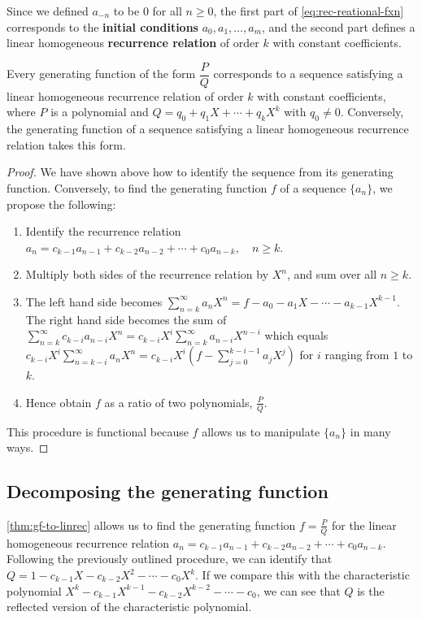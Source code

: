 \documentclass[a4paper, 12pt]{report}
\begin{document}
Since we defined $a_{-n}$ to be $0$ for all $n \geq 0$, the first part of \cref{eq:rec-reational-fxn} corresponds to the \textbf{initial conditions} $a_0, a_1, \dots, a_m$, and the second part defines a linear homogeneous \textbf{recurrence relation} of order $k$ with constant coefficients.

\begin{thm}\label{thm:gf-to-linrec}
Every generating function of the form $\dfrac{P}{Q}$ corresponds to a sequence satisfying a linear homogeneous recurrence relation of order $k$ with constant coefficients, where $P$ is a polynomial and $Q = q_0 + q_1 X + \cdots + q_k X^k$ with $q_0 \neq 0$. Conversely, the generating function of a sequence satisfying a linear homogeneous recurrence relation takes this form.
\end{thm}
\begin{proof}
We have shown above how to identify the sequence from its generating function. Conversely, to find the generating function $f$ of a sequence $\{a_n\}$, we propose the following:

\begin{enumerate}
    \item Identify the recurrence relation $a_n = c_{k - 1} a_{n - 1} + c_{k - 2} a_{n - 2} + \cdots + c_0 a_{n - k}, \quad n \geq k$.
    \item Multiply both sides of the recurrence relation by $X^n$, and sum over all $n \geq k$.
    \item The left hand side becomes $\sum_{n = k}^{\infty} a_n X^n = f - a_0 - a_1 X - \cdots - a_{k - 1} X^{k - 1}$. The right hand side becomes the sum of $\sum_{n=k}^\infty c_{k - i} a_{n - i} X^n = c_{k - i} X^i \sum_{n = k}^\infty a_{n - i} X^{n - i}$ which equals $c_{k - i} X^i \sum_{n = k - i}^\infty a_n X^n = c_{k - i} X^i (f - \sum_{j = 0}^{k - i - 1} a_{j} X^j )$ for $i$ ranging from $1$ to $k$. 
    \item Hence obtain $f$ as a ratio of two polynomials, $\frac{P}{Q}$.
\end{enumerate}

This procedure is functional because $f$ allows us to manipulate $\{a_n\}$ in many ways.
\end{proof}

\subsection{Decomposing the generating function}
\cref{thm:gf-to-linrec} allows us to find the generating function $f = \frac{P}{Q}$ for the linear homogeneous recurrence relation $a_n = c_{k - 1} a_{n - 1} + c_{k - 2} a_{n - 2} + \cdots + c_0 a_{n - k}$. Following the previously outlined procedure, we can identify that $Q = 1 - c_{k - 1} X - c_{k - 2} X^2 - \cdots - c_{0} X^k$. If we compare this with the characteristic polynomial $X^k - c_{k - 1} X^{k - 1} - c_{k - 2} X^{k - 2} - \cdots - c_{0}$, we can see that $Q$ is the reflected version of the characteristic polynomial. 
\end{document}
